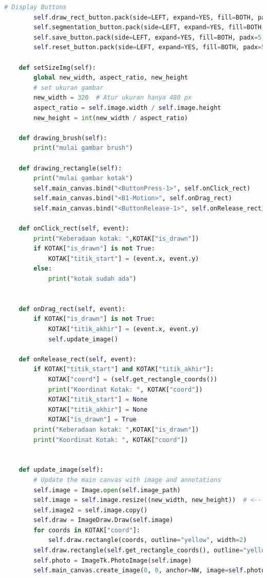 \begin{lstlisting}[language=Python, basicstyle=\tiny]
        # Display Buttons
        self.draw_rect_button.pack(side=LEFT, expand=YES, fill=BOTH, padx=5, pady=(10, 10))
        self.segmentation_button.pack(side=LEFT, expand=YES, fill=BOTH, padx=5, pady=(10, 10))
        self.save_button.pack(side=LEFT, expand=YES, fill=BOTH, padx=5, pady=(10, 10))        
        self.reset_button.pack(side=LEFT, expand=YES, fill=BOTH, padx=5, pady=(10, 10))

    def setSizeImg(self):
        global new_width, aspect_ratio, new_height
        # set ukuran gambar
        new_width = 320  # Atur ukuran hanya 480 px
        aspect_ratio = self.image.width / self.image.height
        new_height = int(new_width / aspect_ratio)

    def drawing_brush(self):
        print("mulai gambar brush")

    def drawing_rectangle(self):
        print("mulai gambar kotak")
        self.main_canvas.bind("<ButtonPress-1>", self.onClick_rect)
        self.main_canvas.bind("<B1-Motion>", self.onDrag_rect)
        self.main_canvas.bind("<ButtonRelease-1>", self.onRelease_rect)

    def onClick_rect(self, event):
        print("Keberadaan kotak: ",KOTAK["is_drawn"])
        if KOTAK["is_drawn"] is not True:
            KOTAK["titik_start"] = (event.x, event.y)
        else:
            print("kotak sudah ada")


    def onDrag_rect(self, event):
        if KOTAK["is_drawn"] is not True:
            KOTAK["titik_akhir"] = (event.x, event.y)
            self.update_image()

    def onRelease_rect(self, event):
        if KOTAK["titik_start"] and KOTAK["titik_akhir"]:
            KOTAK["coord"] = (self.get_rectangle_coords())
            print("Koordinat Kotak: ", KOTAK["coord"])
            KOTAK["titik_start"] = None
            KOTAK["titik_akhir"] = None
            KOTAK["is_drawn"] = True
        print("Keberadaan kotak: ",KOTAK["is_drawn"])
        print("Koordinat Kotak: ", KOTAK["coord"])


    def update_image(self):
        # Update the main canvas with image and annotations
        self.image = Image.open(self.image_path)
        self.image = self.image.resize((new_width, new_height))  # <-- untuk resize ukuran
        self.image2 = self.image.copy()
        self.draw = ImageDraw.Draw(self.image)
        for coords in KOTAK["coord"]:
            self.draw.rectangle(coords, outline="yellow", width=2)
        self.draw.rectangle(self.get_rectangle_coords(), outline="yellow", width=2)
        self.photo = ImageTk.PhotoImage(self.image)
        self.main_canvas.create_image(0, 0, anchor=NW, image=self.photo)
    

\end{lstlisting}
